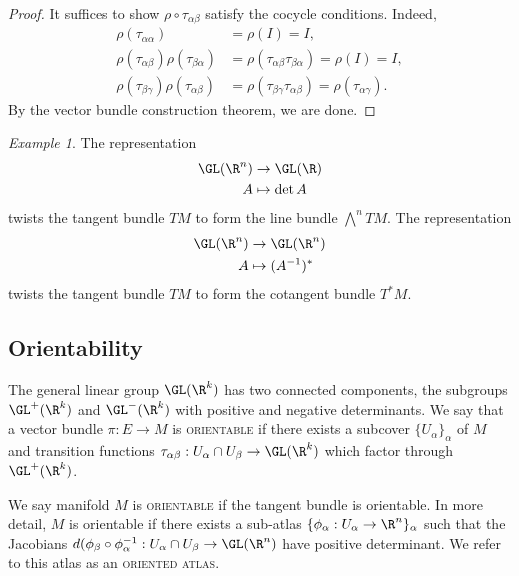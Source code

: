 \documentclass[reqno]{amsart}
\theoremstyle{definition}
\theoremstyle{remark}
\newtheorem*{example}{Example}
\renewcommand{\emph}{\textsc}
\begin{document}
\begin{proof}
	It suffices to show $\rho \circ \tau_{\alpha \beta}$ satisfy the cocycle conditions. Indeed, 
	\begin{align*}
		\rho(\tau_{\alpha \alpha})
			&= \rho (I) = I, \\
		\rho (\tau_{\alpha \beta}) \rho ( \tau_{\beta \alpha})
			&= \rho (\tau_{\alpha \beta} \tau_{\beta \alpha}) = \rho (I) = I, \\
		\rho(\tau_{\beta \gamma}) \rho( \tau_{\alpha \beta}) 
			&=\rho(\tau_{\beta \gamma}\tau_{\alpha \beta})  = \rho( \tau_{\alpha \gamma}).
	\end{align*}
	By the vector bundle construction theorem, we are done. 
\end{proof}

\begin{example}
	The representation 
		\begin{align*}
			\GL (\R^n) 
				&\to \GL (\R)\\
			A
				&\mapsto \det A				
		\end{align*}
	twists the tangent bundle $TM$ to form the line bundle $\bigwedge^n TM$. The representation
		\begin{align*}
			\GL (\R^n) 
				&\to \GL (\R^n)\\
			A
				&\mapsto (A^{-1})^*			
		\end{align*}
	twists the tangent bundle $TM$ to form the cotangent bundle $T^* M$. 	
\end{example}

	

\subsection{Orientability}

The general linear group $\GL (\R^k)$ has two connected components, the subgroups $\GL^+ (\R^k)$ and $\GL^- (\R^k)$ with positive and negative determinants. We say that a vector bundle $\pi : E \to M$ is \emph{orientable} if there exists a subcover $\{U_\alpha\}_\alpha$ of $M$ and transition functions $\tau_{\alpha \beta} : U_\alpha \cap U_\beta \to \GL (\R^k)$ which factor through $\GL^+ (\R^k)$. 

We say manifold $M$ is \emph{orientable} if the tangent bundle is orientable. In more detail, $M$ is orientable if there exists a sub-atlas $\{\phi_\alpha : U_\alpha \to \R^n\}_\alpha$ such that the Jacobians $d(\phi_\beta \circ \phi_\alpha^{-1} : U_\alpha \cap U_\beta \to \GL (\R^n)$ have positive determinant. We refer to this atlas as an \emph{oriented atlas}. 
\end{document}
